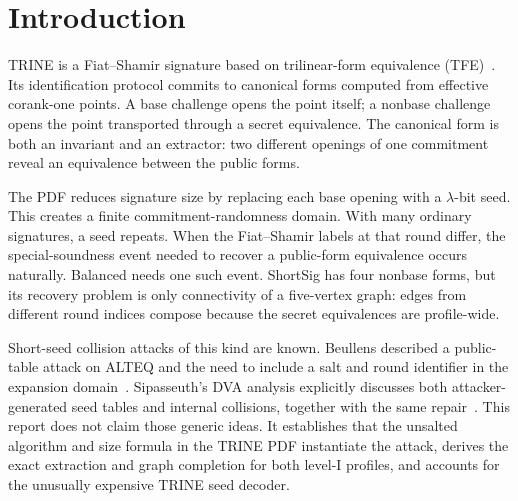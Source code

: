 \documentclass[11pt,a4paper]{article}
\begin{document}
\begin{abstract}
The untouched submitted C source serializes a fresh $2\lambda$-bit salt and
absorbs it in every round expansion.  That source-only field is absent from the
PDF algorithms and size formula, makes level-I signatures 32 bytes longer, and
blocks this cross-signature accumulation.  We therefore claim an attack only
on the direct unsalted, message-independent PDF construction, not on the
untouched salted source.  The generic short-seed collision attack and the
salt-plus-round repair are due to Beullens and Sipasseuth.  Our contribution is
limited to the TRINE instantiation: the PDF/source discrepancy, canonical-
certificate extraction, one-edge Balanced completion, connected-graph ShortSig
completion, exact level-I resource analysis, and end-to-end validation.
\end{abstract}

\section{Introduction}

TRINE is a Fiat--Shamir signature based on trilinear-form equivalence
(TFE)~\cite{trine-spec}.  Its identification protocol commits to canonical
forms computed from effective corank-one points.  A base challenge opens the
point itself; a nonbase challenge opens the point transported through a secret
equivalence.  The canonical form is both an invariant and an extractor: two
different openings of one commitment reveal an equivalence between the public
forms.

The PDF reduces signature size by replacing each base opening with a
$\lambda$-bit seed.  This creates a finite commitment-randomness domain.  With
many ordinary signatures, a seed repeats.  When the Fiat--Shamir labels at that
round differ, the special-soundness event needed to recover a public-form
equivalence occurs naturally.  Balanced needs one such event.  ShortSig has
four nonbase forms, but its recovery problem is only connectivity of a
five-vertex graph: edges from different round indices compose because the
secret equivalences are profile-wide.

Short-seed collision attacks of this kind are known.  Beullens described a
public-table attack on ALTEQ and the need to include a salt and round identifier
in the expansion domain~\cite{beullens2024}.  Sipasseuth's DVA analysis
explicitly discusses both attacker-generated seed tables and internal
collisions, together with the same repair~\cite[Sec.~3.2]{sipasseuth2024}.
This report does not claim those generic ideas.  It establishes that the
unsalted algorithm and size formula in the TRINE PDF instantiate the attack,
derives the exact extraction and graph completion for both level-I profiles,
and accounts for the unusually expensive TRINE seed decoder.
\end{document}
